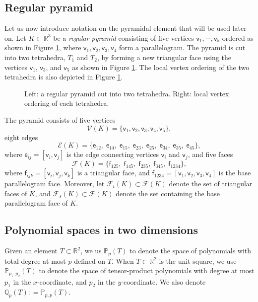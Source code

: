 \documentclass[twoside,reqno,final]{amsart}
\newcommand{\VT}{\mathcal{V}}
\newcommand{\EG}{\mathcal{E}}
\newcommand{\FC}{\mathcal{F}}
\newcommand{\vt}{\mathsf{v}}
\newcommand{\eg}{\mathsf{e}}
\newcommand{\fc}{\mathsf{f}}
\newcommand{\bR}{\mathbb R}
\newcommand{\pol}{\mathbb{P}}
\newcommand{\qol}{\mathbb{Q}}
\begin{document}
\subsection{Regular pyramid}
Let us now introduce notation on the pyramidal element that will be used later on. 
Let  $K\subset \bR^3$ be a {\it regular pyramid}
consisting of five vertices $\vt_1,\cdots,\vt_5$ ordered as shown in Figure \ref{fig-pyramid}, 
where $\vt_1,\vt_2, \vt_3,\vt_4$ form a parallelogram.
The pyramid is cut into two tetrahedra, $T_1$ and $T_2$,  by forming a new triangular face using 
 the vertices $\vt_1$, $\vt_3$, and $\vt_5$ as shown in Figure \ref{fig-pyramid}. 
The local vertex ordering of the two tetrahedra is also depicted in Figure \ref{fig-pyramid}.
\begin{figure}[!ht]
\centerline{
}
\caption{Left: a regular pyramid cut into two tetrahedra. 
Right: local vertex ordering of each tetrahedra.
} \label{fig-pyramid}
\end{figure}

The pyramid consists of five vertices \[\VT(K) = \{\vt_1,\vt_2,\vt_3,\vt_4,\vt_5\},\] 
eight  edges 
 \[\EG(K)=\{\eg_{12}, \;\eg_{14}, \;\eg_{15},\;\eg_{23},\;\eg_{25},\;\eg_{34},\;\eg_{35},\;\eg_{45}
 \},\]
where $\eg_{ij}=[\vt_i,\vt_j]$ is the edge connecting vertices $\vt_i$ and $\vt_j$, 
and five faces 
\[\FC(K)=\{\fc_{125},\;\fc_{145},\;\fc_{235},\;\fc_{345},\;\fc_{1234}
\},
\]
where $\fc_{ijk} = [\vt_i,\vt_j,\vt_k]$ is a triangular face, and 
$\fc_{1234} = [\vt_1, \vt_2,\vt_3,\vt_4]$ is the base parallelogram face.
Moreover, let
$
\FC_t(K)\subset  \FC(K)
$
denote the set of triangular faces of $K$, and 
$
\FC_s(K)\subset  \FC(K)
$
denote the set containing the base parallelogram face of $K$.



\subsection{Polynomial spaces in two dimensions}
Given an element $T\subset \bR^2$, we us
$\pol_p(T)$ to denote the space of polynomials 
with total degree at most $p$ defined on $T$.
When $T\subset \bR^2$ is the unit square, we use 
$\pol_{p_1,p_2}(T)$ to denote the space of tensor-product polynomials with degree at most 
$p_1$ in the $x$-coordinate, and $p_2$ in the $y$-coordinate. 
We also denote $\qol_{p}(T) : = \pol_{p,p}(T)$.
\end{document}
